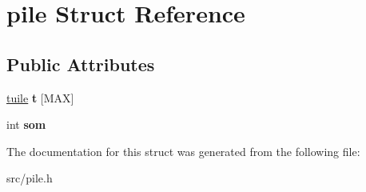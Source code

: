 \hypertarget{structpile}{}\section{pile Struct Reference}
\label{structpile}
\subsection*{Public Attributes}
\begin{DoxyCompactItemize}
\item 
\mbox{\label{structpile_af3c370aeed7f3a03a14c80fb8cfe548a}} 
\hyperlink{structtuile__s}{tuile} {\bfseries t} \mbox{[}M\+AX\mbox{]}
\item 
\mbox{\label{structpile_a381a1e1cf88be00adb3c5805edda88b4}} 
int {\bfseries som}
\end{DoxyCompactItemize}


The documentation for this struct was generated from the following file\+:\begin{DoxyCompactItemize}
\item 
src/pile.\+h\end{DoxyCompactItemize}
